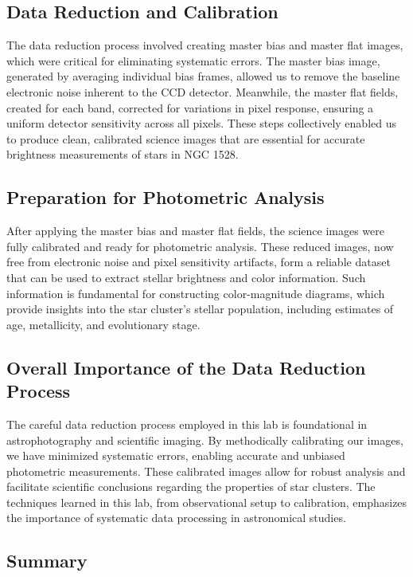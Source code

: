 \documentclass[linenumbers,twocolumn]{aastex631}
\begin{document}
\subsection{Data Reduction and Calibration}

The data reduction process involved creating master bias and master flat images, which were critical for eliminating systematic errors. The master bias image, generated by averaging individual bias frames, allowed us to remove the baseline electronic noise inherent to the CCD detector. Meanwhile, the master flat fields, created for each band, corrected for variations in pixel response, ensuring a uniform detector sensitivity across all pixels. These steps collectively enabled us to produce clean, calibrated science images that are essential for accurate brightness measurements of stars in NGC 1528.

\subsection{Preparation for Photometric Analysis}

After applying the master bias and master flat fields, the science images were fully calibrated and ready for photometric analysis. These reduced images, now free from electronic noise and pixel sensitivity artifacts, form a reliable dataset that can be used to extract stellar brightness and color information. Such information is fundamental for constructing color-magnitude diagrams, which provide insights into the star cluster’s stellar population, including estimates of age, metallicity, and evolutionary stage.

\subsection{Overall Importance of the Data Reduction Process}

The careful data reduction process employed in this lab is foundational in astrophotography and scientific imaging. By methodically calibrating our images, we have minimized systematic errors, enabling accurate and unbiased photometric measurements. These calibrated images allow for robust analysis and facilitate scientific conclusions regarding the properties of star clusters. The techniques learned in this lab, from observational setup to calibration, emphasizes the importance of systematic data processing in astronomical studies.

\subsection{Summary}
\end{document}
